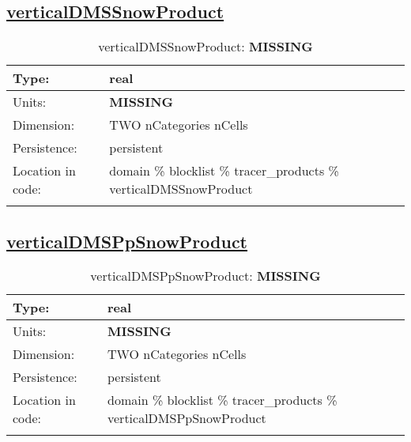 \subsection[verticalDMSSnowProduct]{\hyperref[sec:var_tab_tracer_products]{verticalDMSSnowProduct}}
\label{subsec:var_sec_tracer_products_verticalDMSSnowProduct}
\begin{center}
\begin{longtable}{| p{2.0in} | p{4.0in} |}
        \hline 
        Type: & real \\
        \hline 
        Units: & {\bf \color{red} MISSING} \\
        \hline 
        Dimension: & TWO nCategories nCells \\
        \hline 
        Persistence: & persistent \\
        \hline 
         Location in code: & domain \% blocklist \% tracer\_products \% verticalDMSSnowProduct \\
         \hline 
    \caption{verticalDMSSnowProduct: {\bf \color{red} MISSING}}
\end{longtable}
\end{center}
\subsection[verticalDMSPpSnowProduct]{\hyperref[sec:var_tab_tracer_products]{verticalDMSPpSnowProduct}}
\label{subsec:var_sec_tracer_products_verticalDMSPpSnowProduct}
\begin{center}
\begin{longtable}{| p{2.0in} | p{4.0in} |}
        \hline 
        Type: & real \\
        \hline 
        Units: & {\bf \color{red} MISSING} \\
        \hline 
        Dimension: & TWO nCategories nCells \\
        \hline 
        Persistence: & persistent \\
        \hline 
         Location in code: & domain \% blocklist \% tracer\_products \% verticalDMSPpSnowProduct \\
         \hline 
    \caption{verticalDMSPpSnowProduct: {\bf \color{red} MISSING}}
\end{longtable}
\end{center}
